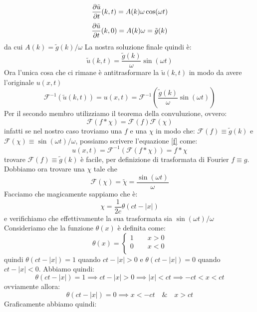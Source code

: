 \documentclass[12pt]{article}
\begin{document}
\[\frac{\partial \tilde{u}}{\partial t}(k,t) = A(k)\omega \cos(\omega t)\]
\[\frac{\partial \tilde{u}}{\partial t}(k,0) =A(k)\omega = \tilde{g}(k) \]
da cui $A(k) = \tilde{g}(k)/\omega$
La nostra soluzione finale quindi è:
\[\tilde{u}(k,t) = \frac{\tilde{g}(k)}{\omega}\sin(\omega t)\]
Ora l'unica cosa che ci rimane è antitrasformare la $\tilde{u}(k,t)$ in modo da avere l'originale $u(x,t)$
\begin{equation}\label{f}
\mathcal{F}^{-1}(\tilde{u}(k,t)) = u(x,t) = \mathcal{F}^{-1}\left(\frac{\tilde{g}(k)}{\omega}\sin(\omega t)\right)
\end{equation}
Per il secondo membro utilizziamo il teorema della convuluzione, ovvero:
\[\mathcal{F}(f*\chi) = \mathcal{F}(f)\mathcal{F}(\chi)\]
infatti se nel nostro caso troviamo una $f$ e una $\chi$ in modo che: $\mathcal{F}(f) \equiv \tilde{g}(k)$ e $\mathcal{F}(\chi) \equiv \sin(\omega t)/\omega$, possiamo scrivere l'equazione \eqref{f} come:
\[u(x,t) = \mathcal{F}^{-1}\left(\mathcal{F}(f*\chi)\right) = f*\chi\]
trovare $\mathcal{F}(f) \equiv \tilde{g}(k)$ è facile, per definizione di trasformata di Fourier $f\equiv g$. Dobbiamo ora trovare una $\chi$ tale che 
\[\mathcal{F}(\chi)=\tilde{\chi} = \frac{\sin(\omega t)}{\omega}\]
Facciamo che magicamente sappiamo che è: \[\chi = \frac{1}{2c}\theta(ct-|x|)\] e verifichiamo che effettivamente la sua trasformata sia $\sin(\omega t)/\omega$
Consideriamo che la funzione $\theta(x)$ è definita come:
\[\theta(x) =\begin{cases}
    1 \qquad x>0  \\
   0\qquad x<0\\
  \end{cases}\]
quindi $\theta(ct-|x|) = 1$ quando $ct-|x|>0$ e $\theta(ct-|x|) = 0$ quando $ct-|x|<0$. Abbiamo quindi:
\[\theta(ct-|x|) = 1 \implies ct-|x|>0 \implies |x|<ct \implies -ct<x<ct\]
ovviamente allora:
\[\theta(ct-|x|) = 0 \implies x<-ct \quad\&\quad x>ct\]
Graficamente abbiamo quindi:
\begin{figure}[H]
\centering
{}
\end{figure}
\end{document}

